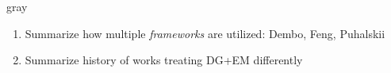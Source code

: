 \begin{color}{gray}
  \begin{enumerate}
    \item
      Summarize how multiple \emph{frameworks} are utilized: Dembo, Feng, Puhalskii
    \item
      Summarize history of works treating DG+EM differently
  \end{enumerate}
\end{color}
